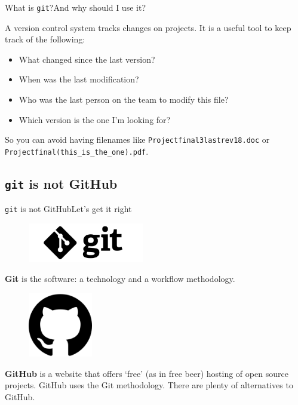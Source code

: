 \documentclass[dvipsnames, usenames]{beamer}
\begin{document}
\begin{frame}{What is \texttt{git}?}{And why should I use it?}

	A version control system tracks changes on projects.
	It is a useful tool to keep track of the following: \pause

	\begin{itemize}
		\item What changed since the last version? \pause
		\item When was the last modification? \pause
		\item Who was the last person on the team to modify this file? \pause
		\item Which version is the one I'm looking for? \pause
	\end{itemize}

	So you can avoid having filenames like \texttt{Projectfinal3lastrev18.doc} or \texttt{Projectfinal(this\_is\_the\_one).pdf}.

\end{frame}


\subsection{\texttt{git} is not GitHub} %
\label{sub:git-not-github}

\begin{frame}[allowframebreaks]{\texttt{git} is not GitHub}{Let's get it right}

	\begin{figure}[h]
		\centering
		\includegraphics[width=0.45\textwidth]{logo}
		\label{fig:git-logo}
	\end{figure}

	\textbf{Git} is the software: a technology and a workflow methodology.

	\framebreak

	\begin{figure}[h]
		\centering
		\includegraphics[width=0.25\textwidth]{octocat}
		\label{fig:github-logo}
	\end{figure}

	\textbf{GitHub} is a website that offers `free' (as in free beer) hosting of open source projects.
	GitHub uses the Git methodology. There are plenty of alternatives to GitHub.
\end{frame}
\end{document}
